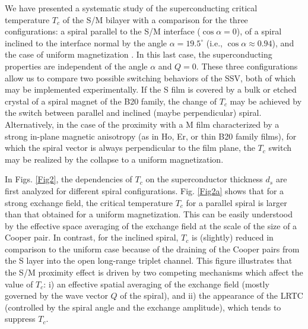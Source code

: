 \documentclass[prb,amsmath,amssymb,reprint]{revtex4-2}
\begin{document}
We have presented a systematic study of the superconducting critical temperature $T_c$ of the S/M bilayer  with a comparison for the three configurations: a spiral parallel to the S/M interface ($\cos \alpha=0$), of a spiral inclined to the interface normal by the angle $\alpha=19.5^{\circ }$ (i.e., $\cos \alpha \approx 0.94$), and the case of   uniform magnetization . In this last case,  the superconducting properties are independent of the angle $\alpha$ and $Q=0$. These three configurations allow us to compare  two possible switching behaviors of the SSV,  both of which may be implemented experimentally.
If the S film is covered by a bulk or etched crystal of a spiral magnet of the B20 family, the change of $T_c$ may be achieved by the switch between parallel and inclined (maybe perpendicular) spiral. Alternatively, in the case of the proximity with a M film characterized by a strong in-plane
magnetic anisotropy (as in Ho, Er, or thin B20 family films), for which the
spiral vector is always perpendicular to the film plane, the $T_c$ switch may be
realized by the collapse to a uniform magnetization.



In Figs. \ref{Fig2}, the dependencies of $T_c$ on the superconductor thickness $d_s$ are first analyzed for different spiral configurations.
Fig. \ref{Fig2a} shows that for a strong exchange field,
the critical temperature $T_c$ for a parallel spiral is larger than that obtained for a uniform magnetization. This can be easily understood by the effective space averaging of the exchange field at the scale of the size of a Cooper pair. In contrast, for the inclined
spiral,  $T_c$  is (slightly) reduced in comparison to the uniform case because of the draining of the Cooper pairs from the S layer
into the open long-range triplet channel. This figure illustrates that the S/M proximity effect is driven by two competing mechanisms which affect the value of $T_c$: i) an effective spatial averaging of the exchange field (mostly governed by the wave vector $Q$ of the spiral), and ii) the appearance of the LRTC (controlled by the spiral angle and the exchange amplitude), which tends to suppress $T_c$.
\end{document}

